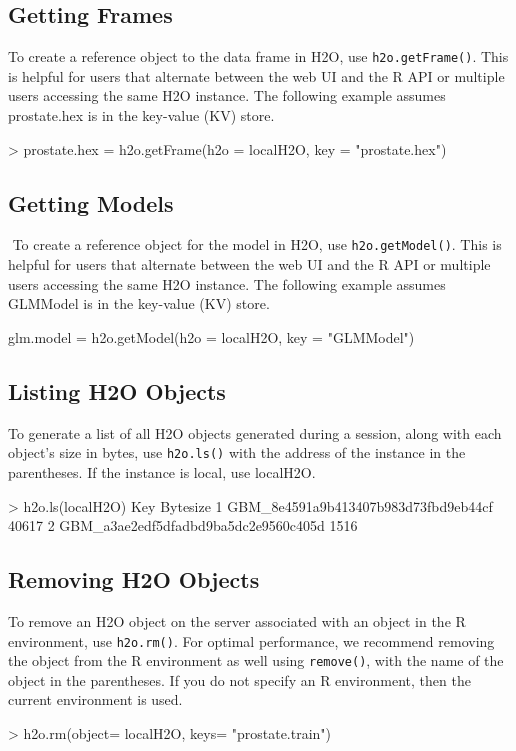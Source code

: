 \documentclass[11pt]{article}
\begin{document}
\subsection{Getting Frames}

To create a reference object to the data frame in H2O, use {\texttt{h2o.getFrame()}}. This is helpful for  users that alternate between the web UI and the R API or multiple users accessing the same H2O instance. The following example assumes prostate.hex is in the key-value (KV) store.

\begin{spverbatim}
> prostate.hex = h2o.getFrame(h2o = localH2O, key = "prostate.hex")
\end{spverbatim}


\subsection{Getting Models}
 To create a reference object for the model in H2O, use {\texttt{h2o.getModel()}}. This is helpful for  users that alternate between the web UI and the R API or multiple users accessing the same H2O instance. The following example assumes GLMModel is in the key-value (KV) store.
\begin{spverbatim}
glm.model = h2o.getModel(h2o = localH2O, key = "GLMModel")
\end{spverbatim}

\subsection{Listing H2O Objects}

To generate a list of all H2O objects generated during a session, along with each object’s size in bytes, use {\texttt{h2o.ls()}} with the address of the instance in the parentheses. If the instance is local, use localH2O. 

\begin{spverbatim}
> h2o.ls(localH2O)
                                                   Key Bytesize
      1               GBM_8e4591a9b413407b983d73fbd9eb44cf    40617
      2               GBM_a3ae2edf5dfadbd9ba5dc2e9560c405d     1516
\end{spverbatim}


\subsection{Removing H2O Objects}

To remove an H2O object on the server associated with an object in the R environment, use {\texttt{h2o.rm()}}. For optimal performance, we recommend removing the object from the R environment as well using {\texttt{remove()}}, with the name of the object in the parentheses. If you do not specify an R environment, then the current environment is used. 
\begin{spverbatim}
> h2o.rm(object= localH2O, keys= "prostate.train")
\end{spverbatim}
\end{document}
